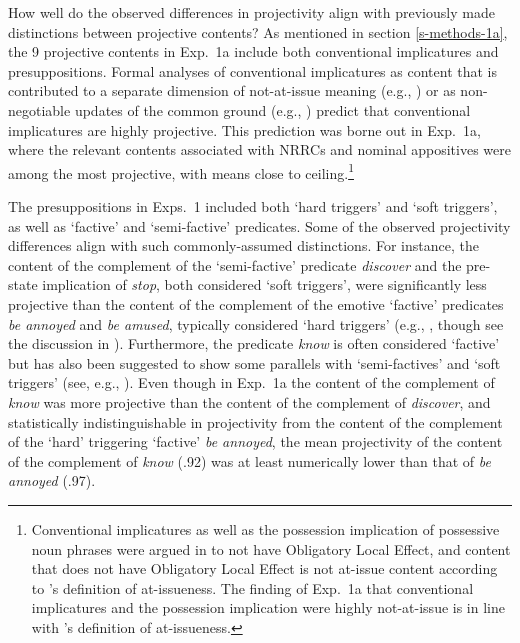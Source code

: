 \documentclass[11pt,fleqn]{article}
\newcommand{\6}{\mbox{$[\hspace*{-.6mm}[$}}
\newcommand{\9}{\mbox{$]\hspace*{-.6mm}]$}}
\newcommand{\citepos}[1]{\citeauthor{#1}'s \citeyear{#1}}
\begin{document}
How well do the observed differences in projectivity align with previously made distinctions between projective contents? As mentioned in section \ref{s-methods-1a}, the 9 projective contents in Exp.~1a include both conventional implicatures and presuppositions. Formal analyses of conventional implicatures as content that is contributed to a separate dimension of not-at-issue meaning (e.g., \citealt{potts05}) or as non-negotiable updates of the common ground (e.g., \citealt{murray2014,anderbois-etal2015}) predict that conventional implicatures are highly projective. This prediction was borne out in Exp.~1a, where the relevant contents associated with NRRCs and nominal appositives were among the most projective, with means close to ceiling.\footnote{Conventional implicatures as well as the possession implication of possessive noun phrases were argued in \citealt{brst-lang11} to not have Obligatory Local Effect, and content that does not have Obligatory Local Effect is not at-issue content according to \citepos{brst-ar} definition of at-issueness. The finding of Exp.~1a that conventional implicatures and the possession implication were highly not-at-issue is in line with \citepos{brst-ar}  definition of at-issueness.} 

The presuppositions in Exps.~1 included both `hard triggers' and `soft triggers', as well as `factive' and `semi-factive' predicates. Some of the observed projectivity differences align with such commonly-assumed distinctions. For instance, the content of the complement of the `semi-factive' predicate {\em discover} and the pre-state implication of {\em stop}, both considered `soft triggers', were significantly less projective than the content of the complement of the emotive `factive' predicates {\em be annoyed} and {\em be amused}, typically considered `hard triggers' (e.g., \citealt{abusch10}, though see the discussion in \citealt{abrusan2011,abrusan2016}). Furthermore, the predicate {\em know} is often considered `factive' but has also been suggested to show some parallels with `semi-factives' and `soft triggers' (see, e.g., \citealt{kiparsky-kiparsky71,levinson83,simons01,chemla09b,beaver-geurts-sep}). Even though in Exp.~1a the content of the complement of {\em know} was more projective than the content of the complement of {\em discover}, and statistically indistinguishable in projectivity from the content of the complement of the `hard' triggering `factive' {\em be annoyed}, the mean projectivity of the content of the complement of {\em know} (.92) was at least numerically lower than that of {\em be annoyed} (.97).
\end{document}
